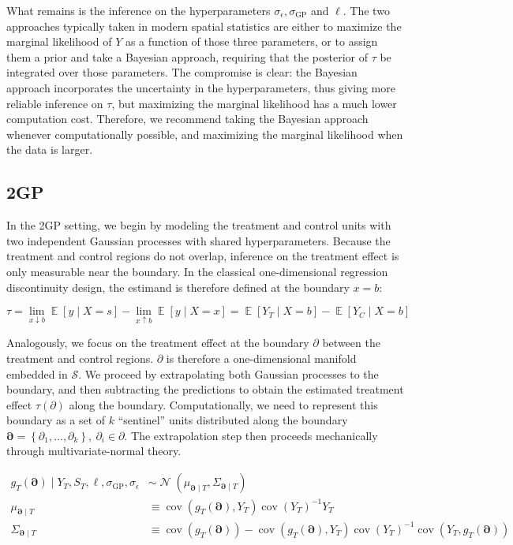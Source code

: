 \documentclass[letter]{article}
\newcommand{\genericdel}[3]{%
      \left#1#3\right#2
    }
\newcommand{\del}[1]{\genericdel(){#1}}
\newcommand{\sbr}[1]{\genericdel[]{#1}}
\newcommand{\cbr}[1]{\genericdel\{\}{#1}}
\DeclareMathOperator{\E}{\mathbb{E}}
\DeclareMathOperator{\cov}{{cov}}
\DeclareMathOperator{\normal}{\mathcal{N}}
\newcommand{\scrS}{\mathscr{S}}
\newcommand{\sigmaf}{\sigma_{\mathrm{GP}}}
\newcommand{\sigman}{\sigma_{\epsilon}}
\newcommand{\boundary}{\partial}
\newcommand{\sentinels}{\bm{\boundary}}
\begin{document}
What remains is the inference on the hyperparameters
\(\sigman, \sigmaf\) and \(\ell\). The two approaches typically taken in
modern spatial statistics are either to maximize the marginal likelihood
of \(Y\) as a function of those three parameters, or to assign them a
prior and take a Bayesian approach, requiring that the posterior of
\(\tau\) be integrated over those parameters. The compromise is clear:
the Bayesian approach incorporates the uncertainty in the
hyperparameters, thus giving more reliable inference on \(\tau\), but
maximizing the marginal likelihood has a much lower computation cost.
Therefore, we recommend taking the Bayesian approach whenever
computationally possible, and maximizing the marginal likelihood when
the data is larger.
    


    	\subsection{2GP}\label{gp}

In the 2GP setting, we begin by modeling the treatment and control units
with two independent Gaussian processes with shared hyperparameters.
Because the treatment and control regions do not overlap, inference on
the treatment effect is only measurable near the boundary. In the
classical one-dimensional regression discontinuity design, the estimand
is therefore defined at the boundary \(x=b\):

\begin{equation}
\tau = \lim_{x \downarrow b} \E\sbr{y \mid X=s} - \lim_{x \uparrow b} \E\sbr{y \mid X=x} = \E\sbr{Y_T \mid X=b} - \E\sbr{Y_C \mid X=b}
\end{equation}

Analogously, we focus on the treatment effect at the boundary
\(\boundary\) between the treatment and control regions. \(\boundary\)
is therefore a one-dimensional manifold embedded in \(\scrS\). We
proceed by extrapolating both Gaussian processes to the boundary, and
then subtracting the predictions to obtain the estimated treatment
effect \(\tau(\boundary)\) along the boundary. Computationally, we need
to represent this boundary as a set of \(k\) ``sentinel'' units
distributed along the boundary
\(\sentinels=\cbr{\boundary_1,\ldots,\boundary_k},~\partial_i \in \partial\).
The extrapolation step then proceeds mechanically through
multivariate-normal theory.

\begin{equation}\begin{split}
    g_T(\sentinels) \mid Y_T, S_T, \ell, \sigmaf, \sigman &\sim \normal\del{\mu_{\sentinels \mid T}, \Sigma_{\sentinels \mid T}} \\
    \mu_{\sentinels \mid T} &\equiv \cov\del{g_T(\sentinels), Y_T} \cov\del{Y_T}^{-1}  Y_T \\
    \Sigma_{\sentinels \mid T} &\equiv \cov \del{g_T(\sentinels)} - \cov\del{g_T(\sentinels), Y_T} \cov\del{Y_T}^{-1} \cov\del{Y_T,g_T(\sentinels) \label{eq:postvarT2gp}
    }
\end{split}\end{equation}
\end{document}
